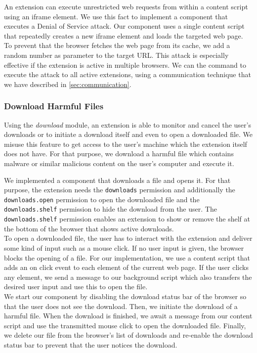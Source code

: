 	An extension can execute unrestricted web requests from within a content script using an iframe element. We use this fact to implement a component that executes a Denial of Service attack. Our component uses a single content script that repeatedly creates a new iframe element and loads the targeted web page. To prevent that the browser fetches the web page from its cache, we add a random number as parameter to the target URL. This attack is especially effective if the extension is active in multiple browsers. We can the command to execute the attack to all active extensions, using a communication technique that we have described in \autoref{sec:communication}.

\subsubsection{Download Harmful Files}
\label{sec:downloads}

	Using the \textit{download} module, an extension is able to monitor and cancel the user's downloads or to initiate a download itself and even to open a downloaded file. We misuse this feature to get access to the user's machine which the extension itself does not have. For that purpose, we download a harmful file which contains malware or similar malicious content on the user's computer and execute it. 
	
	We implemented a component that downloads a file and opens it. For that purpose, the extension needs the \texttt{downloads} permission and additionally the \texttt{downloads.open} permission to open the downloaded file and the \texttt{downloads.shelf} permission to hide the download from the user. The \texttt{downloads.shelf} permission enables an extension to show or remove the shelf at the bottom of the browser that shows active downloads. \\
	To open a downloaded file, the user has to interact with the extension and deliver some kind of input such as a mouse click. If no user input is given, the browser blocks the opening of a file. For our implementation, we use a content script that adds an on click event to each element of the current web page. If the user clicks any element, we send a message to our background script which also transfers the desired user input and use this to open the file. \\
	We start our component by disabling the download status bar of the browser so that the user does not see the download. Then, we initiate the download of a harmful file. When the download is finished, we await a message from our content script and use the transmitted mouse click to open the downloaded file. Finally, we delete our file from the browser's list of downloads and re-enable the download status bar to prevent that the user notices the download.
	
